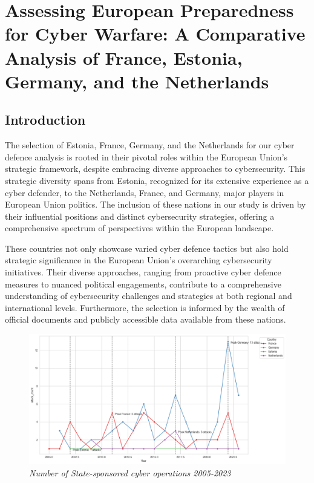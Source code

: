 \chapter{Assessing European Preparedness for Cyber Warfare: A Comparative Analysis of France, Estonia, Germany, and the Netherlands}


\section{Introduction}
The selection of Estonia, France, Germany, and the Netherlands for our cyber defence analysis is rooted in their pivotal roles within the European Union's strategic framework, despite embracing diverse approaches to cybersecurity. This strategic diversity spans from Estonia, recognized for its extensive experience as a cyber defender, to the Netherlands, France, and Germany, major players in European Union politics. The inclusion of these nations in our study is driven by their influential positions and distinct cybersecurity strategies, offering a comprehensive spectrum of perspectives within the European landscape.

These countries not only showcase varied cyber defence tactics but also hold strategic significance in the European Union's overarching cybersecurity initiatives. Their diverse approaches, ranging from proactive cyber defence measures to nuanced political engagements, contribute to a comprehensive understanding of cybersecurity challenges and strategies at both regional and international levels. Furthermore, the selection is informed by the wealth of official documents and publicly accessible data available from these nations. 

\begin{figure}[H]
    \centering
    \includegraphics[width=1\textwidth]{Images/attack_countries.png}
    \caption{\textit{Number of State-sponsored cyber operations 2005-2023}}
    \label{fig:attack_countries}
\end{figure}

